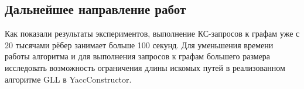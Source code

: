 \documentclass[14pt]{matmex-diploma}
\begin{document}
\subsection{Дальнейшее направление работ}

Как показали результаты экспериментов, выполнение КС-запросов к графам уже с 20 тысячами рёбер занимает больше 100 секунд. Для уменьшения времени работы алгоритма и для выполнения запросов к графам большего размера исследовать возможность ограничения длины искомых путей в реализованном алгоритме GLL в YaccConstructor.

\setmonofont[Mapping=tex-text]{CMU Typewriter Text}


\end{document}
